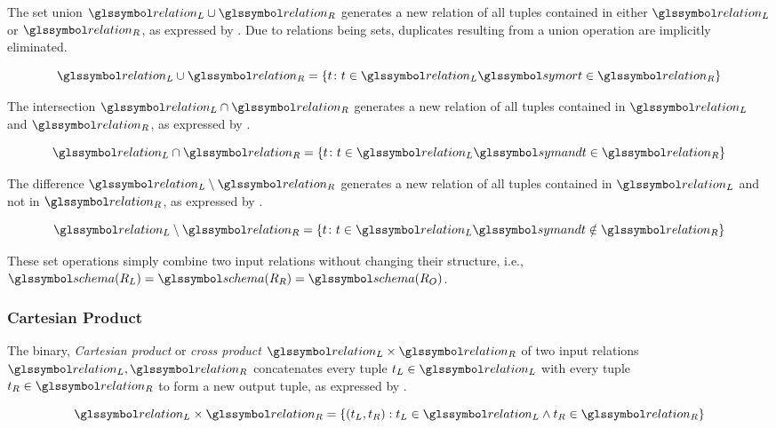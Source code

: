 The set union $\relation_L \cup \relation_R$ generates a new relation of all tuples contained in either $\relation_L$ or $\relation_R$, as expressed by . Due to relations being sets, duplicates resulting from a union operation are implicitly eliminated.

\begin{equation}
    \label{equation:rel_op_union}
    \relation_L \cup \relation_R = \{ t \colon t \in \relation_L \symor t \in \relation_R \}
\end{equation}

The intersection $\relation_L \cap \relation_R$ generates a new relation of all tuples contained in $\relation_L$ and $\relation_R$, as expressed by .

\begin{equation}
    \label{equation:rel_op_intersection}
    \relation_L \cap \relation_R = \{ t \colon t \in \relation_L \symand t \in \relation_R \}
\end{equation}

The difference $\relation_L \setminus \relation_R$ generates a new relation of all tuples contained in $\relation_L$ and not in $\relation_R$, as expressed by .

\begin{equation}
    \label{equation:rel_op_difference}
    \relation_L \setminus \relation_R = \{ t \colon t \in \relation_L \symand t \notin \relation_R \}
\end{equation}

These set operations simply combine two input relations without changing their structure, i.e., $\schema(R_{L}) = \schema(R_{R}) = \schema(R_{O})$. 

\subsubsection{Cartesian Product}
The binary, \emph{Cartesian product} or \emph{cross product} $\relation_L \times \relation_R$ of two input relations $\relation_L,\relation_R$ concatenates every tuple $t_{L} \in \relation_L$ with every tuple $t_{R} \in \relation_R$ to form a new output tuple, as expressed by .

\begin{equation}
    \label{equation:rel_op_cartesian}
    \relation_L \times \relation_R = \{ (t_L, t_R) : t_L \in \relation_L \wedge t_R \in \relation_R \}
\end{equation}


